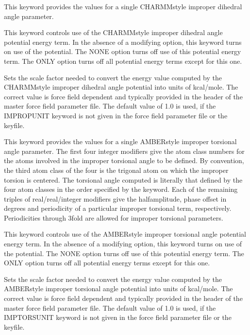 \documentclass[letterpaper,11pt,english]{sphinxmanual}
\begin{document}
  This keyword provides the values for a single CHARMM\sphinxhyphen{}style improper dihedral angle parameter.

  This keyword controls use of the CHARMM\sphinxhyphen{}style improper dihedral angle potential energy term. In the absence of a modifying option, this keyword turns on use of the potential. The NONE option turns off use of this potential energy term. The ONLY option turns off all potential energy terms except for this one.

  Sets the scale factor needed to convert the energy value computed by the CHARMM\sphinxhyphen{}style improper dihedral angle potential into units of kcal/mole. The correct value is force field dependent and typically provided in the header of the master force field parameter file. The default value of 1.0 is used, if the IMPROPUNIT keyword is not given in the force field parameter file or the keyfile.

  This keyword provides the values for a single AMBER\sphinxhyphen{}style improper torsional angle parameter. The first four integer modifiers give the atom class numbers for the atoms involved in the improper torsional angle to be defined. By convention, the third atom class of the four is the trigonal atom on which the improper torsion is centered. The torsional angle computed is literally that defined by the four atom classes in the order specified by the keyword. Each of the remaining triples of real/real/integer modifiers give the half\sphinxhyphen{}amplitude, phase offset in degrees and periodicity of a particular improper torsional term, respectively. Periodicities through 3\sphinxhyphen{}fold are allowed for improper torsional parameters.

  This keyword controls use of the AMBER\sphinxhyphen{}style improper torsional angle potential energy term. In the absence of a modifying option, this keyword turns on use of the potential. The NONE option turns off use of this potential energy term. The ONLY option turns off all potential energy terms except for this one.

  Sets the scale factor needed to convert the energy value computed by the AMBER\sphinxhyphen{}style improper torsional angle potential into units of kcal/mole. The correct value is force field dependent and typically provided in the header of the master force field parameter file. The default value of 1.0 is used, if the IMPTORSUNIT keyword is not given in the force field parameter file or the keyfile.
\end{document}
